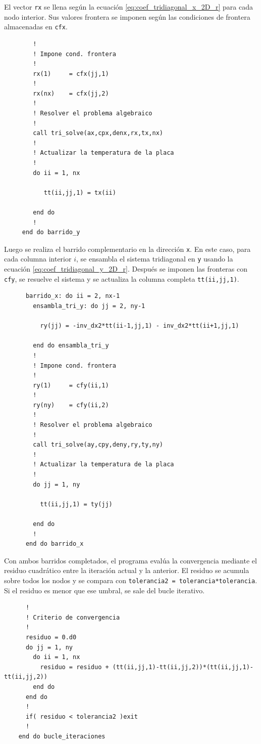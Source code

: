 \documentclass[11pt,a4paper]{article}
\begin{document}
El vector \texttt{rx} se llena seg\'un la ecuaci\'on 
\ref{eq:coef_tridiagonal_x_2D_r} para cada nodo interior. Sus valores frontera
se imponen seg\'un las condiciones de frontera almacenadas en \texttt{cfx}.

\begin{verbatim}
        !
        ! Impone cond. frontera
        !
        rx(1)     = cfx(jj,1)
        !
        rx(nx)    = cfx(jj,2)
        !
        ! Resolver el problema algebraico
        !
        call tri_solve(ax,cpx,denx,rx,tx,nx)
        !
        ! Actualizar la temperatura de la placa
        !
        do ii = 1, nx
           
           tt(ii,jj,1) = tx(ii)
           
        end do
        !
     end do barrido_y
\end{verbatim}

  Luego se realiza el barrido complementario en la direcci\'on \texttt{x}. En
  este caso, para cada columna interior \(i\), se ensambla el sistema
  tridiagonal en \texttt{y} usando la ecuaci\'on
  \ref{eq:coef_tridiagonal_y_2D_r}. Despu\'es se imponen las fronteras con
  \texttt{cfy}, se resuelve el sistema y se actualiza la columna completa
  \texttt{tt(ii,jj,1)}.

  \begin{verbatim}
      barrido_x: do ii = 2, nx-1
        ensambla_tri_y: do jj = 2, ny-1

          ry(jj) = -inv_dx2*tt(ii-1,jj,1) - inv_dx2*tt(ii+1,jj,1)

        end do ensambla_tri_y
        !
        ! Impone cond. frontera
        !
        ry(1)     = cfy(ii,1)
        !
        ry(ny)    = cfy(ii,2)
        !
        ! Resolver el problema algebraico
        !
        call tri_solve(ay,cpy,deny,ry,ty,ny)
        !
        ! Actualizar la temperatura de la placa
        !
        do jj = 1, ny

          tt(ii,jj,1) = ty(jj)

        end do
        !
      end do barrido_x
  \end{verbatim}

  Con ambos barridos completados, el programa eval\'ua la convergencia mediante
  el residuo cuadr\'atico entre la iteraci\'on actual y la anterior. El residuo
  se acumula sobre todos los nodos y se compara con
  \texttt{tolerancia2 = tolerancia*tolerancia}. Si el residuo es menor que ese
  umbral, se sale del bucle iterativo.

  \begin{verbatim}
      !
      ! Criterio de convergencia
      !
      residuo = 0.d0
      do jj = 1, ny
        do ii = 1, nx
          residuo = residuo + (tt(ii,jj,1)-tt(ii,jj,2))*(tt(ii,jj,1)-tt(ii,jj,2))
        end do
      end do
      !
      if( residuo < tolerancia2 )exit
      !
    end do bucle_iteraciones
  \end{verbatim}
\end{document}
